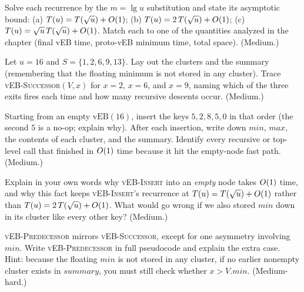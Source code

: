 \begin{exercise}
Solve each recurrence by the $m=\lg u$ substitution and state its asymptotic bound:
(a) $T(u)=T(\sqrt u)+O(1)$; (b) $T(u)=2\,T(\sqrt u)+O(1)$;
(c) $T(u)=\sqrt u\,T(\sqrt u)+O(1)$. Match each to one of the quantities analyzed in the
chapter (final vEB time, proto-vEB minimum time, total space). (Medium.)
\end{exercise}

\begin{exercise}
Let $u=16$ and $S=\{1,2,6,9,13\}$. Lay out the clusters and the summary
(remembering that the floating minimum is not stored in any cluster). Trace
\textsc{vEB-Successor}$(V, x)$ for $x = 2$, $x = 6$, and $x = 9$, naming which of
the three exits fires each time and how many recursive descents occur.
(Medium.)
\end{exercise}

\begin{exercise}
Starting from an empty $\text{vEB}(16)$, insert the keys $5, 2, 8, 5, 0$ in that
order (the second $5$ is a no-op; explain why). After each insertion, write down
$\mathit{min}$, $\mathit{max}$, the contents of each cluster, and the summary.
Identify every recursive or top-level call that finished in $O(1)$ time because it hit the empty-node
fast path. (Medium.)
\end{exercise}

\begin{exercise}
Explain in your own words why \textsc{vEB-Insert} into an \emph{empty} node takes
$O(1)$ time, and why this fact keeps \textsc{vEB-Insert}'s recurrence at
$T(u)=T(\sqrt u)+O(1)$ rather than $T(u)=2\,T(\sqrt u)+O(1)$. What would
go wrong if we also stored $\mathit{min}$ down in its cluster like every other
key? (Medium.)
\end{exercise}

\begin{exercise}
\label{ch21:ex-pred}
\textsc{vEB-Predecessor} mirrors \textsc{vEB-Successor}, except for one
asymmetry involving
$\mathit{min}$. Write \textsc{vEB-Predecessor} in full pseudocode and explain the
extra case. Hint: because the floating $\mathit{min}$ is not stored in any
cluster, if no earlier nonempty cluster exists in $\mathit{summary}$, you must still check whether $x > V.\mathit{min}$. (Medium-hard.)
\end{exercise}

